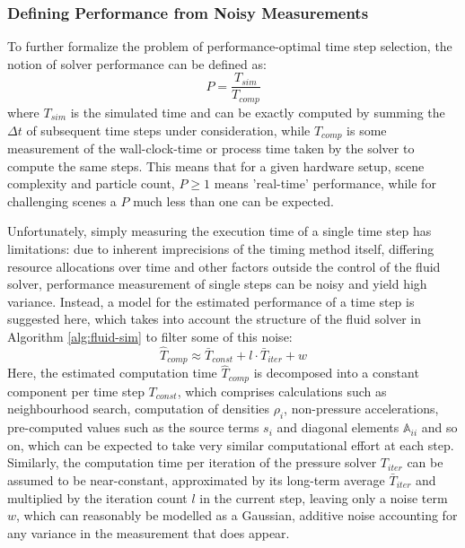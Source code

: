 \documentclass[oneside, a4paper]{book}
\begin{document}
    \subsubsection{Defining Performance from Noisy Measurements}

    To further formalize the problem of performance-optimal time step selection, the notion of solver performance can be defined as:
    \begin{equation}\label{eq:solver-performance}
      P = \frac{T_{sim}}{T_{comp}}
    \end{equation}
    where $T_{sim}$ is the simulated time and can be exactly computed by summing the $\Delta t$ of subsequent time steps under consideration, while $T_{comp}$ is some measurement of the wall-clock-time or process time taken by the solver to compute the same steps. This means that for a given hardware setup, scene complexity and particle count, $P\geq 1$ means 'real-time' performance, while for challenging scenes a $P$ much less than one can be expected.

    Unfortunately, simply measuring the execution time of a single time step has limitations: due to inherent imprecisions of the timing method itself, differing resource allocations over time and other factors outside the control of the fluid solver, performance measurement of single steps can be noisy and yield high variance. Instead, a model for the estimated performance of a time step is suggested here, which takes into account the structure of the fluid solver in Algorithm \ref{alg:fluid-sim} to filter some of this noise:
    \begin{equation}\label{eq:perf-cost-model}
      \hat{T}_{comp} \approx \bar{T}_{const} + l \cdot \bar{T}_{iter} + w
    \end{equation}
    Here, the estimated computation time $\hat{T}_{comp}$ is decomposed into a constant component per time step $T_{const}$, which comprises calculations such as neighbourhood search, computation of densities $\rho_i$, non-pressure accelerations, pre-computed values such as the source terms $s_i$ and diagonal elements $\mathds{A}_{ii}$ and so on, which can be expected to take very similar computational effort at each step. 
    Similarly, the computation time per iteration of the pressure solver $T_{iter}$ can be assumed to be near-constant, approximated by its long-term average $\bar{T}_{iter}$ and multiplied by the iteration count $l$ in the current step, leaving only a noise term $w$, which can reasonably be modelled as a Gaussian, additive noise accounting for any variance in the measurement that does appear.
\end{document}
